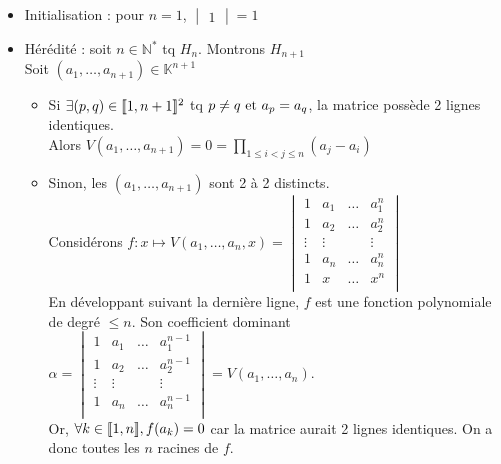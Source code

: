 \documentclass[]{article}
\begin{document}
\begin{itemize}
    \item Initialisation : pour $n = 1$, $\begin{vmatrix}
        1
    \end{vmatrix} = 1$
    \item Hérédité : soit $n \in \mathbb{N}^*$ tq $H_n$. Montrons $H_{n+1}$ \\
    
    Soit $(a_1, \dots, a_{n+1}) \in \mathbb{K}^{n+1}$
    \begin{itemize}
        \item Si $\exists (p, q) \in \llbracket {1}, {n+1} \rrbracket^2$ tq $p \neq q \text{ et } a_p = a_q$, la matrice possède 2 lignes identiques. \\
        
        Alors $V(a_1, \dots, a_{n+1}) = 0 = \prod_{1 \leq i < j \leq n} (a_j - a_i)$ \\

        \item Sinon, les $(a_1, \dots, a_{n+1})$ sont 2 à 2 distincts. \\
        
        Considérons $f:x \mapsto V(a_1, \dots, a_n, x) = \begin{vmatrix}
            1 & a_1 & \dots & a_1^n \\
            1 & a_2 & \dots & a_2^n \\
            \vdots & \vdots &  & \vdots \\
            1 & a_n & \dots & a_n^n \\
            1 & x & \dots & x^n \\
        \end{vmatrix}$ \\

        En développant suivant la dernière ligne, $f$ est une fonction polynomiale de degré $\leq n$. Son coefficient dominant $\alpha = \begin{vmatrix}
            1 & a_1 & \dots & a_1^{n-1} \\
            1 & a_2 & \dots & a_2^{n-1} \\
            \vdots & \vdots &  & \vdots \\
            1 & a_n & \dots & a_n^{n-1} \\
        \end{vmatrix} = V(a_1, \dots, a_n)$. \\

        Or, $\forall k \in \llbracket {1}, {n} \rrbracket, f(a_k) = 0$ car la matrice aurait 2 lignes identiques. On a donc toutes les $n$ racines de $f$. \\


\end{itemize}
\end{itemize}
\end{document}
